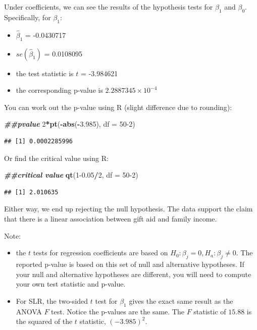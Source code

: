 \documentclass[
]{book}
\newenvironment{Shaded}{\begin{snugshade}}{\end{snugshade}}
\newcommand{\AttributeTok}[1]{\textcolor[rgb]{0.13,0.29,0.53}{#1}}
\newcommand{\DecValTok}[1]{\textcolor[rgb]{0.00,0.00,0.81}{#1}}
\newcommand{\DocumentationTok}[1]{\textcolor[rgb]{0.56,0.35,0.01}{\textbf{\textit{#1}}}}
\newcommand{\FloatTok}[1]{\textcolor[rgb]{0.00,0.00,0.81}{#1}}
\newcommand{\FunctionTok}[1]{\textcolor[rgb]{0.13,0.29,0.53}{\textbf{#1}}}
\newcommand{\NormalTok}[1]{#1}
\newcommand{\SpecialCharTok}[1]{\textcolor[rgb]{0.81,0.36,0.00}{\textbf{#1}}}
\providecommand{\tightlist}{%
  \setlength{\itemsep}{0pt}\setlength{\parskip}{0pt}}
\begin{document}
Under coefficients, we can see the results of the hypothesis tests for \(\beta_1\) and \(\beta_0\). Specifically, for \(\beta_1\):

\begin{itemize}
\tightlist
\item
  \(\hat{\beta}_1\) = -0.0430717
\item
  \(se(\hat{\beta}_1)\) = 0.0108095
\item
  the test statistic is \(t\) = -3.984621
\item
  the corresponding p-value is \ensuremath{2.2887345\times 10^{-4}}
\end{itemize}

You can work out the p-value using R (slight difference due to rounding):

\begin{Shaded}
\begin{Highlighting}[]
\DocumentationTok{\#\#pvalue}
\DecValTok{2}\SpecialCharTok{*}\FunctionTok{pt}\NormalTok{(}\SpecialCharTok{{-}}\FunctionTok{abs}\NormalTok{(}\SpecialCharTok{{-}}\FloatTok{3.985}\NormalTok{), }\AttributeTok{df =} \DecValTok{50{-}2}\NormalTok{)}
\end{Highlighting}
\end{Shaded}

\begin{verbatim}
## [1] 0.0002285996
\end{verbatim}

Or find the critical value using R:

\begin{Shaded}
\begin{Highlighting}[]
\DocumentationTok{\#\#critical value}
\FunctionTok{qt}\NormalTok{(}\DecValTok{1}\FloatTok{{-}0.05}\SpecialCharTok{/}\DecValTok{2}\NormalTok{, }\AttributeTok{df =} \DecValTok{50{-}2}\NormalTok{)}
\end{Highlighting}
\end{Shaded}

\begin{verbatim}
## [1] 2.010635
\end{verbatim}

Either way, we end up rejecting the null hypothesis. The data support the claim that there is a linear association between gift aid and family income.

Note:

\begin{itemize}
\item
  the \(t\) tests for regression coefficients are based on \(H_0: \beta_j = 0, H_a: \beta_j \neq 0\). The reported p-value is based on this set of null and alternative hypotheses. If your null and alternative hypotheses are different, you will need to compute your own test statistic and p-value.
\item
  For SLR, the two-sided \(t\) test for \(\beta_1\) gives the exact same result as the ANOVA \(F\) test. Notice the p-values are the same. The \(F\) statistic of \(15.88\) is the squared of the \(t\) statistic, \((-3.985)^2\).
\end{itemize}
\end{document}
